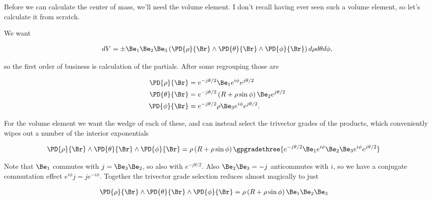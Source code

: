 Before we can calculate the center of mass, we'll need the volume element.  I don't recall having ever seen such a volume element, so let's calculate it from scratch.

We want 

\begin{align}\label{eqn:torusCenterOfMass:2}
dV = \pm \Be_1 \Be_2 \Be_3 \left( \PD{\rho}{\Br} \wedge \PD{\theta}{\Br} \wedge \PD{\phi}{\Br} \right) d\rho d\theta d\phi,
\end{align}

so the first order of business is calculation of the partials.  After some regrouping those are

\begin{subequations}
\begin{align}\label{eqn:torusCenterOfMass:3}
\PD{\rho}{\Br} &= e^{-j\theta/2} \Be_1 e^{ i \phi } e^{j \theta/2} \\
\PD{\theta}{\Br} 
&= e^{-j\theta/2} \left( R + \rho \sin\phi \right) \Be_2 e^{j \theta/2} \\
\PD{\phi}{\Br} &= e^{-j\theta/2} \rho \Be_3 e^{ i \phi } e^{j \theta/2}.
\end{align}
\end{subequations}

For the volume element we want the wedge of each of these, and can instead select the trivector grades of the products, which conveniently wipes out a number of the interior exponentials

\begin{align}\label{eqn:torusCenterOfMass:4}
\PD{\rho}{\Br} \wedge \PD{\theta}{\Br} \wedge \PD{\phi}{\Br} 
&= 
\rho \left( R + \rho \sin\phi \right) \gpgradethree{ e^{-j\theta/2} \Be_1 e^{ i \phi } \Be_2 \Be_3 e^{ i \phi } e^{j \theta/2} } 
\end{align}

Note that $\Be_1$ commutes with $j = \Be_3 \Be_2$, so also with $e^{-j\theta/2}$.  Also $\Be_2 \Be_3 = -j$ anticommutes with $i$, so we have a conjugate commutation effect $e^{i\phi} j = j e^{-i\phi}$.  Together the trivector grade selection reduces almost magically to just

\begin{align}\label{eqn:torusCenterOfMass:5}
\PD{\rho}{\Br} \wedge \PD{\theta}{\Br} \wedge \PD{\phi}{\Br} 
&= 
\rho \left( R + \rho \sin\phi \right) \Be_1 \Be_2 \Be_3 
\end{align}

